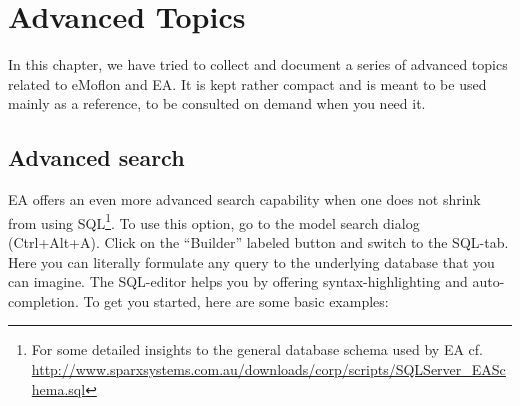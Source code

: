 \chapter{Advanced Topics}
\label{chap:advanced_topics}

In this chapter, we have tried to collect and document a series of advanced topics related to eMoflon and EA.
It is kept rather compact and is meant to be used mainly as a reference, to be consulted on demand when you need it.

\section{Advanced search}
\label{sect:appendix_adv_search}

EA offers an even more advanced search capability when one does not shrink from
using SQL\footnote{For some detailed insights to the general database schema
used by EA cf. \\
\url{http://www.sparxsystems.com.au/downloads/corp/scripts/SQLServer_EASchema.sql}}.
To use this option, go to the model search dialog (\mbox{Ctrl+Alt+A}). Click on
the ``Builder'' labeled button and switch to the SQL-tab. Here you can
literally formulate any query to the underlying database that you can imagine.
The SQL-editor helps you by offering syntax-highlighting and auto-completion. To
get you started, here are some basic examples: 

